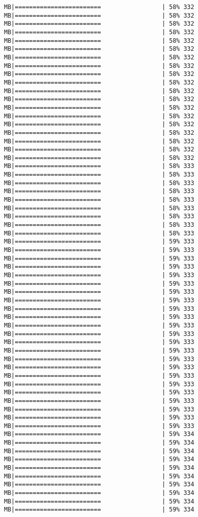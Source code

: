\documentclass[
]{article}
\begin{document}
\begin{verbatim}
MB|========================                 | 58% 332 MB|========================                 | 58% 332 MB|========================                 | 58% 332 MB|========================                 | 58% 332 MB|========================                 | 58% 332 MB|========================                 | 58% 332 MB|========================                 | 58% 332 MB|========================                 | 58% 332 MB|========================                 | 58% 332 MB|========================                 | 58% 332 MB|========================                 | 58% 332 MB|========================                 | 58% 332 MB|========================                 | 58% 332 MB|========================                 | 58% 332 MB|========================                 | 58% 332 MB|========================                 | 58% 332 MB|========================                 | 58% 332 MB|========================                 | 58% 332 MB|========================                 | 58% 332 MB|========================                 | 58% 333 MB|========================                 | 58% 333 MB|========================                 | 58% 333 MB|========================                 | 58% 333 MB|========================                 | 58% 333 MB|========================                 | 58% 333 MB|========================                 | 58% 333 MB|========================                 | 58% 333 MB|========================                 | 58% 333 MB|========================                 | 59% 333 MB|========================                 | 59% 333 MB|========================                 | 59% 333 MB|========================                 | 59% 333 MB|========================                 | 59% 333 MB|========================                 | 59% 333 MB|========================                 | 59% 333 MB|========================                 | 59% 333 MB|========================                 | 59% 333 MB|========================                 | 59% 333 MB|========================                 | 59% 333 MB|========================                 | 59% 333 MB|========================                 | 59% 333 MB|========================                 | 59% 333 MB|========================                 | 59% 333 MB|========================                 | 59% 333 MB|========================                 | 59% 333 MB|========================                 | 59% 333 MB|========================                 | 59% 333 MB|========================                 | 59% 333 MB|========================                 | 59% 333 MB|========================                 | 59% 333 MB|========================                 | 59% 333 MB|========================                 | 59% 334 MB|========================                 | 59% 334 MB|========================                 | 59% 334 MB|========================                 | 59% 334 MB|========================                 | 59% 334 MB|========================                 | 59% 334 MB|========================                 | 59% 334 MB|========================                 | 59% 334 MB|========================                 | 59% 334 MB|========================                 | 59% 334 
\end{verbatim}
\end{document}
